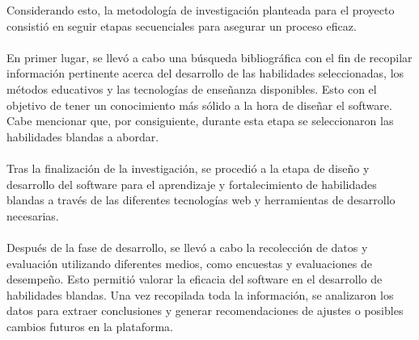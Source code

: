 Considerando esto, la metodología de investigación planteada para el proyecto consistió en seguir etapas secuenciales para asegurar un proceso eficaz.
\\ \\
En primer lugar, se llevó a cabo una búsqueda bibliográfica con el fin de recopilar información pertinente acerca del desarrollo de las habilidades seleccionadas, los métodos educativos y las tecnologías de enseñanza disponibles. Esto con el objetivo de tener un conocimiento más sólido a la hora de diseñar el software. Cabe mencionar que, por consiguiente, durante esta etapa se seleccionaron las habilidades blandas a abordar.
\\ \\
Tras la finalización de la investigación, se procedió a la etapa de diseño y desarrollo del software para el aprendizaje y fortalecimiento de habilidades blandas a través de las diferentes tecnologías web y herramientas de desarrollo necesarias.
\\ \\
Después de la fase de desarrollo, se llevó a cabo la recolección de datos y evaluación utilizando diferentes medios, como encuestas y evaluaciones de desempeño. Esto permitió valorar la eficacia del software en el desarrollo de habilidades blandas. Una vez recopilada toda la información, se analizaron los datos para extraer conclusiones y generar recomendaciones de ajustes o posibles cambios futuros en la plataforma.


